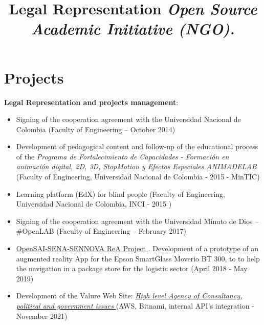 \documentclass[overlapped,line,final]{res}
\begin{document}
\begin{resume}
\begin{itemize}
\end{itemize}
    

\vspace{0.5cm}
\section{\sc Projects } %
\vspace{0.5cm}
\title{\bf Legal Representation
	\newline \em Open Source Academic Initiative (NGO).
}
\begin{position}
	\textbf{Legal Representation and projects management}:
	\begin{itemize}
		\item Signing of the cooperation agreement with the Universidad Nacional de Colombia (Faculty of Engineering – October 2014)
		\item Development of pedagogical content and follow-up of the educational process of the \textit{Programa de Fortalecimiento de Capacidades - Formación en animación digital, 2D, 3D, StopMotion y Efectos Especiales ANIMADELAB} (Faculty of Engineering, Universidad Nacional de Colombia - 2015 - MinTIC)
		\item Learning platform (EdX) for blind people (Faculty of Engineering, Universidad Nacional de Colombia, INCI - 2015 )
		\item Signing of the cooperation agreement with the Universidad Minuto de Dios – \#OpenLAB (Faculty of Engineering – February 2017)
		\item \href{https://rea.opensai.org/}{OpenSAI-SENA-SENNOVA ReA Project }. Development of a prototype of an augmented reality App for the Epson SmartGlass Moverio BT 300, to to help the navigation in a package store for the logistic sector (April 2018 - May 2019)
		\item Development of the Valure Web Site: \href{https://valure.com.co}{\textit{High level Agency of Consultancy, political and government issues} } (AWS, Bitnami, internal API's integration - November 2021)

\end{itemize}
\end{position}
\end{resume}
\end{document}
